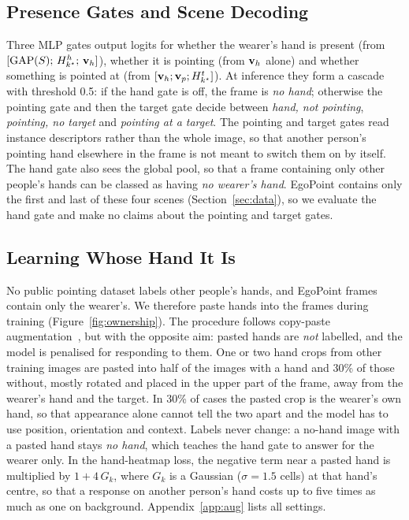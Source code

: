 \subsection{Presence Gates and Scene Decoding}\label{sec:gates}
Three MLP gates output logits for whether the wearer's hand is present (from $[\mathrm{GAP}(S);\,H^h_{k^\star};\,\mathbf{v}_h]$), whether it is pointing (from $\mathbf{v}_h$ alone) and whether something is pointed at (from $[\mathbf{v}_h;\mathbf{v}_p;H^t_{k^\star}]$). At inference they form a cascade with threshold 0.5: if the hand gate is off, the frame is \emph{no hand}; otherwise the pointing gate and then the target gate decide between \emph{hand, not pointing}, \emph{pointing, no target} and \emph{pointing at a target}. The pointing and target gates read instance descriptors rather than the whole image, so that another person's pointing hand elsewhere in the frame is not meant to switch them on by itself. The hand gate also sees the global pool, so that a frame containing only other people's hands can be classed as having \emph{no wearer's hand}. EgoPoint contains only the first and last of these four scenes (Section~\ref{sec:data}), so we evaluate the hand gate and make no claims about the pointing and target gates.

\subsection{Learning Whose Hand It Is}\label{sec:ownership}
No public pointing dataset labels other people's hands, and EgoPoint frames contain only the wearer's. We therefore paste hands into the frames during training (Figure~\ref{fig:ownership}). The procedure follows copy-paste augmentation~\cite{dwibedi2017cut,ghiasi2021simple}, but with the opposite aim: pasted hands are \emph{not} labelled, and the model is penalised for responding to them. One or two hand crops from other training images are pasted into half of the images with a hand and 30\% of those without, mostly rotated and placed in the upper part of the frame, away from the wearer's hand and the target. In 30\% of cases the pasted crop is the wearer's own hand, so that appearance alone cannot tell the two apart and the model has to use position, orientation and context. Labels never change: a no-hand image with a pasted hand stays \emph{no hand}, which teaches the hand gate to answer for the wearer only. In the hand-heatmap loss, the negative term near a pasted hand is multiplied by $1+4\,G_k$, where $G_k$ is a Gaussian ($\sigma{=}1.5$ cells) at that hand's centre, so that a response on another person's hand costs up to five times as much as one on background. Appendix~\ref{app:aug} lists all settings.

